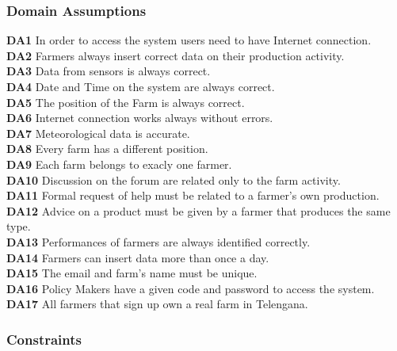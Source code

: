 \subsubsection{Domain Assumptions}
\textbf{DA1} In order to access the system users need to have Internet connection.\\
\textbf{DA2} Farmers always insert correct data on their production activity.\\
\textbf{DA3} Data from sensors is always correct.\\
\textbf{DA4} Date and Time on the system are always correct.\\
\textbf{DA5} The position of the Farm is always correct.\\
\textbf{DA6} Internet connection works always without errors.\\
\textbf{DA7} Meteorological data is accurate.\\
\textbf{DA8} Every farm has a different position.\\
\textbf{DA9} Each farm belongs to exacly one farmer.\\
\textbf{DA10} Discussion on the forum are related only to the farm activity.\\
\textbf{DA11} Formal request of help must be related to a farmer's own production.\\
\textbf{DA12} Advice on a product must be given by a farmer that produces the same type.\\
\textbf{DA13} Performances of farmers are always identified correctly.\\
\textbf{DA14} Farmers can insert data more than once a day.\\
\textbf{DA15} The email and farm's name must be unique.\\
\textbf{DA16} Policy Makers have a given code and password to access the system.\\
\textbf{DA17} All farmers that sign up own a real farm in Telengana.\\


\subsubsection{Constraints}